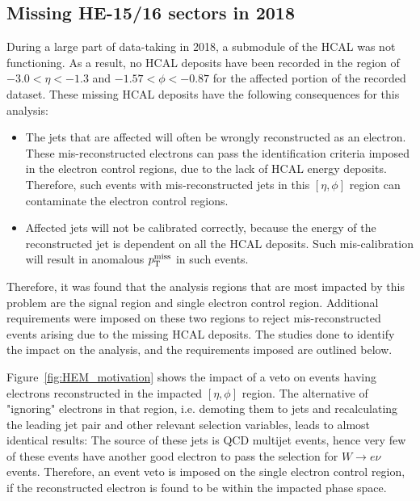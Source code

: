 \subsection{Missing HE-15/16 sectors in 2018}
\label{subsec:hem}

During a large part of data-taking in 2018, a submodule of the HCAL was not
functioning. As a result, no HCAL deposits have been recorded in the region of
$-3.0 < \eta < -1.3$ and $-1.57 < \phi < -0.87$ for the affected portion of the
recorded dataset. These missing HCAL deposits have the following consequences
for this analysis:

\begin{itemize}
    \item The jets that are affected will often be wrongly reconstructed as an electron. These mis-reconstructed
    electrons can pass the identification criteria imposed in the electron control regions, due
    to the lack of HCAL energy deposits. Therefore, such events with mis-reconstructed jets in
    this $[\eta,\phi]$ region can contaminate the electron control regions.
    \item Affected jets will not be calibrated correctly, because the energy of the reconstructed jet
    is dependent on all the HCAL deposits. Such mis-calibration will result in anomalous $p_{\textrm{T}}^{\textrm{miss}}$ in such events. 
\end{itemize}

Therefore, it was found that the analysis regions that are most impacted by this problem are the signal region and single 
electron control region. Additional requirements were imposed on these two regions to reject mis-reconstructed events arising
due to the missing HCAL deposits. The studies done to identify the impact on the analysis, and the requirements imposed are
outlined below. 

Figure~\ref{fig:HEM_motivation} shows the impact of a veto on 
events having electrons reconstructed in the impacted $[\eta,\phi]$ region. 
The alternative of "ignoring" electrons in that region, i.e. demoting them to jets 
and recalculating the leading jet pair and other relevant selection variables, 
leads to almost identical results: The source of these jets is QCD multijet events, 
hence very few of these events have another good electron to pass the selection for 
$W \rightarrow e \nu$ events. Therefore, an event veto is imposed on the single electron
control region, if the reconstructed electron is found to be within the impacted phase space.

